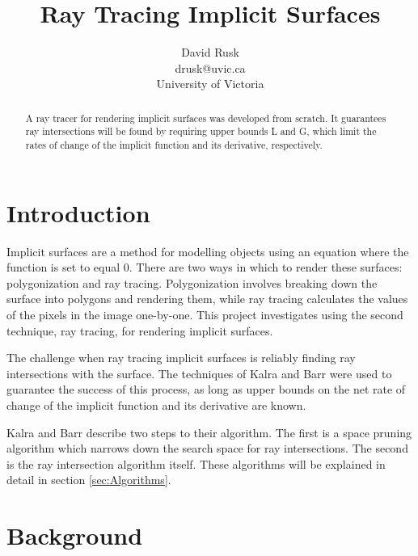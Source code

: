 \documentclass[conference]{acmsiggraph}
\title{Ray Tracing Implicit Surfaces}
\author{David Rusk\\drusk@uvic.ca\\University of Victoria}
\begin{document}
\maketitle

\begin{abstract}

A ray tracer for rendering implicit surfaces was developed from scratch.
It guarantees ray intersections will be found by requiring upper 
bounds L and G, which limit the rates of change of the implicit function 
and its derivative, respectively.

\end{abstract}

\keywordlist


\TOGlinkslist



\section{Introduction}

Implicit surfaces are a method for modelling objects using an equation
where the function is set to equal 0.  There are two ways in which to
render these surfaces: polygonization and ray tracing.  Polygonization
involves breaking down the surface into polygons and rendering them, 
while ray tracing calculates the values of the pixels in the image
one-by-one.  This project investigates using the second technique, 
ray tracing, for rendering implicit surfaces.

The challenge when ray tracing implicit surfaces is reliably finding
ray intersections with the surface.  The techniques of Kalra and
Barr \cite{KalraBarr1989} were used to guarantee the success of this
process, as long as upper bounds on the net rate of change of the 
implicit function and its derivative are known.  

Kalra and Barr describe two steps to their algorithm.  The first is a
space pruning algorithm which narrows down the search space for 
ray intersections.  The second is the ray intersection algorithm 
itself.  These algorithms will be explained in detail in section 
\ref{sec:Algorithms}.

\section{Background}
\end{document}
